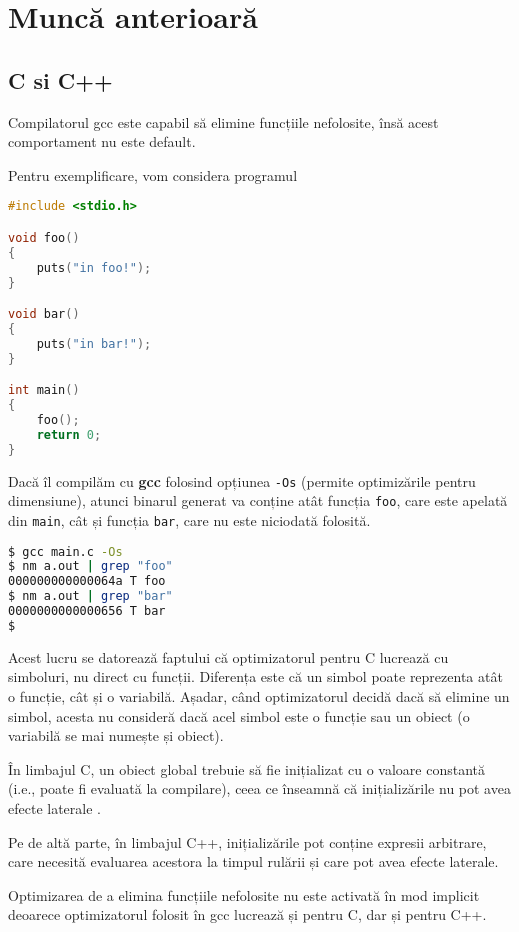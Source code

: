\section{Muncă anterioară}

\subsection{C si C++}

Compilatorul gcc este capabil să elimine funcțiile nefolosite,
însă acest comportament nu este default.

Pentru exemplificare, vom considera programul
\begin{lstlisting}[language=C, title=main.c, label=c_program]
#include <stdio.h>

void foo()
{
    puts("in foo!");
}

void bar()
{
    puts("in bar!");
}

int main()
{
    foo();
    return 0;
}
\end{lstlisting}

Dacă îl compilăm cu \textbf{gcc} folosind opțiunea \texttt{-Os}
(permite optimizările pentru dimensiune), atunci binarul generat
va conține atât funcția \texttt{foo}, care este apelată din
\texttt{main}, cât și funcția \texttt{bar}, care nu este
niciodată folosită.

\begin{lstlisting}[language=Bash]
$ gcc main.c -Os
$ nm a.out | grep "foo"
000000000000064a T foo
$ nm a.out | grep "bar"
0000000000000656 T bar
$
\end{lstlisting}

Acest lucru se datorează faptului că optimizatorul pentru C
lucrează cu simboluri, nu direct cu funcții.  Diferența este că
un simbol poate reprezenta atât o funcție, cât și o variabilă.
Așadar, când optimizatorul decidă dacă să elimine un simbol,
acesta nu consideră dacă acel simbol este o funcție sau un obiect
(o variabilă se mai numește și obiect).

În limbajul C, un obiect global trebuie să fie inițializat cu o
valoare constantă (i.e., poate fi evaluată la compilare), ceea ce
înseamnă că inițializările nu pot avea efecte laterale
\cite{c_static_init}.

Pe de altă parte, în limbajul C++, inițializările pot conține
expresii arbitrare, care necesită evaluarea acestora la timpul
rulării \cite{cpp_static_init} și care pot avea efecte laterale.

Optimizarea de a elimina funcțiile nefolosite nu este activată în
mod implicit deoarece optimizatorul folosit în gcc lucrează și
pentru C, dar și pentru C++.

